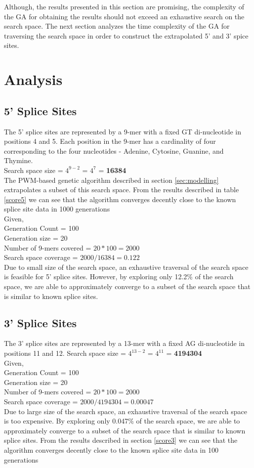 \documentclass[12pt,a4paper]{article}
\begin{document}
	Although, the results presented in this section are promising, the complexity of the GA for obtaining the results should not exceed an exhaustive search on the search space. The next section analyzes the time complexity of the GA for traversing the search space in order to construct the extrapolated 5' and 3' spice sites. 
	
	\section{Analysis} \label{sec-analysis}
	\subsection{5' Splice Sites}
	The 5' splice sites are represented by a 9-mer with a fixed GT di-nucleotide in positions 4 and 5. Each position in the 9-mer has a cardinality of four corresponding to the four nucleotides - Adenine, Cytosine, Guanine, and Thymine. \\
	Search space size = $4^{9-2}$ = $4^7$ = \textbf{16384} \\
	The PWM-based genetic algorithm described in section \ref{sec:modelling} extrapolates a subset of this search space. From the results described in table \ref{score5} we can see that the algorithm converges decently close to the known splice site data in 1000 generations\\
	Given, \\
	Generation Count = 100 \\
	Generation size = 20 \\
	Number of 9-mers covered = $20 * 100 = 2000 $\\
	Search space coverage = $2000 / 16384 = 0.122$ \\
	Due to small size of the search space, an exhaustive traversal of the search space is feasible for 5' splice sites. However, by exploring only 12.2\% of the search space, we are able to approximately converge to a subset of the search space that is similar to known splice sites.

	\subsection{3' Splice Sites}
	The 3' splice sites are represented by a 13-mer with a fixed AG di-nucleotide in positions 11 and 12.
	Search space size = $4^{13-2}$ = $4^11$ = \textbf{4194304} \\
	Given, \\
	Generation Count = 100 \\
	Generation size = 20 \\
	Number of 9-mers covered = $20 * 100 = 2000 $\\
	Search space coverage = $2000 / 4194304 = 0.00047$ \\
	Due to large size of the search space, an exhaustive traversal of the search space is too expensive. By exploring only 0.047\% of the search space, we are able to approximately converge to a subset of the search space that is similar to known splice sites.
	From the results described in section \ref{score3} we can see that the algorithm converges decently close to the known splice site data in 100 generations\par
\end{document}
